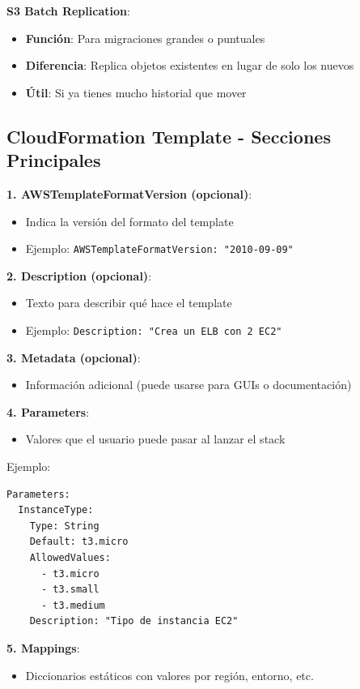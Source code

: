 \documentclass[12pt,a4paper]{report}
\begin{document}
\textbf{S3 Batch Replication}:
\begin{itemize}
    \item \textbf{Función}: Para migraciones grandes o puntuales
    \item \textbf{Diferencia}: Replica objetos existentes en lugar de solo los nuevos
    \item \textbf{Útil}: Si ya tienes mucho historial que mover
\end{itemize}

\subsection{CloudFormation Template - Secciones Principales}

\textbf{1. AWSTemplateFormatVersion (opcional)}:
\begin{itemize}
    \item Indica la versión del formato del template
    \item Ejemplo: \texttt{AWSTemplateFormatVersion: "2010-09-09"}
\end{itemize}

\textbf{2. Description (opcional)}:
\begin{itemize}
    \item Texto para describir qué hace el template
    \item Ejemplo: \texttt{Description: "Crea un ELB con 2 EC2"}
\end{itemize}

\textbf{3. Metadata (opcional)}:
\begin{itemize}
    \item Información adicional (puede usarse para GUIs o documentación)
\end{itemize}

\textbf{4. Parameters}:
\begin{itemize}
    \item Valores que el usuario puede pasar al lanzar el stack
\end{itemize}

Ejemplo:
\begin{verbatim}
Parameters:
  InstanceType:
    Type: String
    Default: t3.micro
    AllowedValues:
      - t3.micro
      - t3.small
      - t3.medium
    Description: "Tipo de instancia EC2"
\end{verbatim}

\textbf{5. Mappings}:
\begin{itemize}
    \item Diccionarios estáticos con valores por región, entorno, etc.
\end{itemize}
\end{document}
